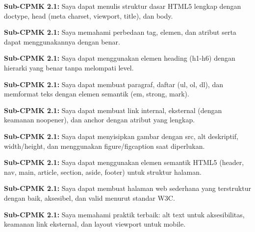 \documentclass[../main.tex]{subfiles}
\begin{document}
\begin{checklist}
  \item \textbf{Sub-CPMK 2.1:} Saya dapat menulis struktur dasar HTML5 lengkap dengan doctype, head (meta charset, viewport, title), dan body.
  \item \textbf{Sub-CPMK 2.1:} Saya memahami perbedaan tag, elemen, dan atribut serta dapat menggunakannya dengan benar.
  \item \textbf{Sub-CPMK 2.1:} Saya dapat menggunakan elemen heading (h1-h6) dengan hierarki yang benar tanpa melompati level.
  \item \textbf{Sub-CPMK 2.1:} Saya dapat membuat paragraf, daftar (ul, ol, dl), dan memformat teks dengan elemen semantik (em, strong, mark).
  \item \textbf{Sub-CPMK 2.1:} Saya dapat membuat link internal, eksternal (dengan keamanan noopener), dan anchor dengan atribut yang lengkap.
  \item \textbf{Sub-CPMK 2.1:} Saya dapat menyisipkan gambar dengan src, alt deskriptif, width/height, dan menggunakan figure/figcaption saat diperlukan.
  \item \textbf{Sub-CPMK 2.1:} Saya dapat menggunakan elemen semantik HTML5 (header, nav, main, article, section, aside, footer) untuk struktur halaman.
  \item \textbf{Sub-CPMK 2.1:} Saya dapat membuat halaman web sederhana yang terstruktur dengan baik, aksesibel, dan valid menurut standar W3C.
  \item \textbf{Sub-CPMK 2.1:} Saya memahami praktik terbaik: alt text untuk aksesibilitas, keamanan link eksternal, dan layout viewport untuk mobile.
\end{checklist}
\end{document}

